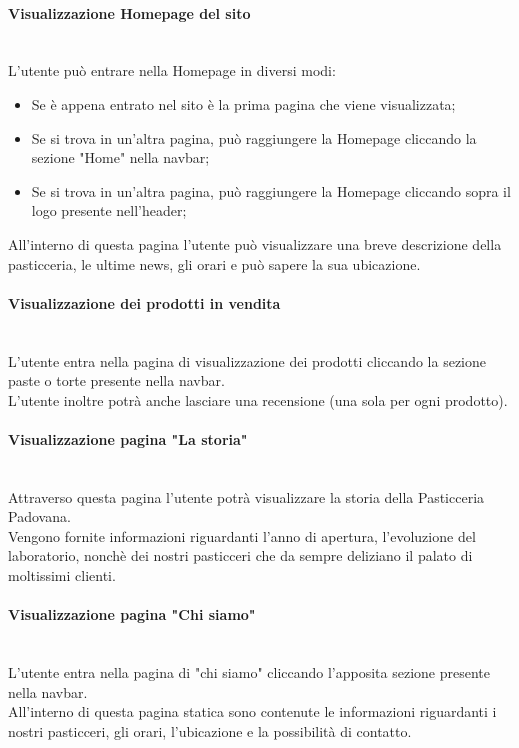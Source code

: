 
\paragraph{Visualizzazione Homepage del sito}\mbox{}\\
\label{par:VisHome}
L'utente può entrare nella Homepage in diversi modi:
\begin{itemize}
	\item Se è appena entrato nel sito è la prima pagina che viene visualizzata;
	\item Se si trova in un'altra pagina, può raggiungere la Homepage cliccando la sezione "Home" nella navbar;
	\item Se si trova in un'altra pagina, può raggiungere la Homepage cliccando sopra il logo presente nell'header;
\end{itemize}
All'interno di questa pagina l'utente può visualizzare una breve descrizione della pasticceria,
le ultime news, gli orari e può sapere la sua ubicazione.

\paragraph{Visualizzazione dei prodotti in vendita}\mbox{}\\
\label{par:Visprodotti}
L'utente entra nella pagina di visualizzazione dei prodotti cliccando la sezione paste o torte presente nella navbar.\\
L'utente inoltre potrà anche lasciare una recensione (una sola per ogni prodotto).

\paragraph{Visualizzazione pagina "La storia"}\mbox{}\\
\label{par:VisStoria}
Attraverso questa pagina l'utente potrà visualizzare la storia della Pasticceria Padovana.\\
Vengono fornite informazioni riguardanti l'anno di apertura, l'evoluzione del laboratorio,
nonchè dei nostri pasticceri che da sempre deliziano il palato di moltissimi clienti.

\paragraph{Visualizzazione pagina "Chi siamo"}\mbox{}\\
\label{par:VisAbout}
L'utente entra nella pagina di "chi siamo" cliccando l'apposita sezione presente nella navbar.\\
All'interno di questa pagina statica sono contenute le informazioni riguardanti i nostri pasticceri,
gli orari, l'ubicazione e la possibilità di contatto.

